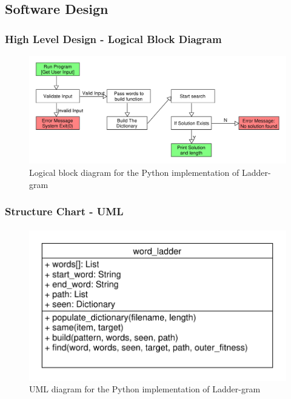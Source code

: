 \documentclass[12pt, a4]{report}
\begin{document}
\subsection{Software Design}
	\subsubsection{High Level Design - Logical Block Diagram}

	\begin{figure}[!h]
	\centering
	\includegraphics[scale=0.6]{Logical_Block_Laddergram}
	\caption{Logical block diagram for the Python implementation of Ladder-gram}
	\end{figure}
				
	\pagebreak

	\subsubsection{Structure Chart - UML}
	\paragraph{}

	\begin{figure}[!h]
	\centering
	\includegraphics[scale=0.7]{UML}
	\caption{UML diagram for the Python implementation of Ladder-gram}
	\end{figure}
\end{document}
